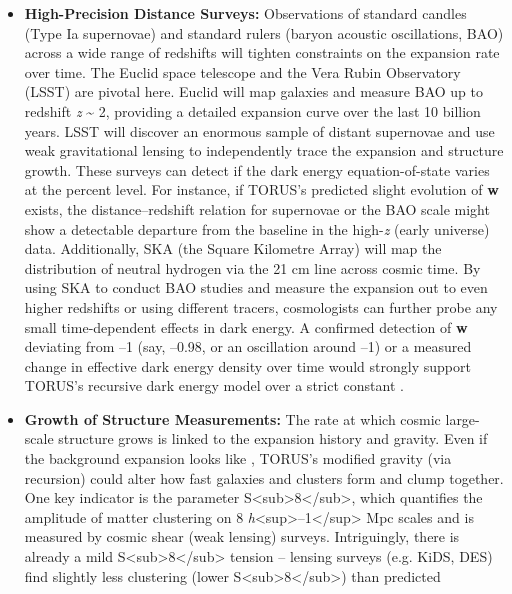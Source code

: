 \documentclass[
]{article}
\begin{document}
\begin{itemize}
\item
  \textbf{High-Precision Distance Surveys:} Observations of standard
  candles (Type Ia supernovae) and standard rulers (baryon acoustic
  oscillations, BAO) across a wide range of redshifts will tighten
  constraints on the expansion rate over time. The Euclid space
  telescope and the Vera Rubin Observatory (LSST) are pivotal here.
  Euclid will map galaxies and measure BAO up to redshift \emph{z}
  \textasciitilde{} 2, providing a detailed expansion curve over the
  last 10 billion years. LSST will discover an enormous sample of
  distant supernovae and use weak gravitational lensing to independently
  trace the expansion and structure growth. These surveys can detect if
  the dark energy equation-of-state varies at the percent level. For
  instance, if TORUS's predicted slight evolution of \textbf{w} exists,
  the distance--redshift relation for supernovae or the BAO scale might
  show a detectable departure from the \LambdaCDM baseline in the
  high-\emph{z} (early universe) data. Additionally, SKA (the Square
  Kilometre Array) will map the distribution of neutral hydrogen via the
  21 cm line across cosmic time. By using SKA to conduct BAO studies and
  measure the expansion out to even higher redshifts or using different
  tracers, cosmologists can further probe any small time-dependent
  effects in dark energy. A confirmed detection of \textbf{w} deviating
  from --1 (say, --0.98, or an oscillation around --1) or a measured
  change in effective dark energy density over time would strongly
  support TORUS's recursive dark energy model over a strict constant \Lambda.
\item
  \textbf{Growth of Structure Measurements:} The rate at which cosmic
  large-scale structure grows is linked to the expansion history and
  gravity. Even if the background expansion looks like \LambdaCDM, TORUS's
  modified gravity (via recursion) could alter how fast galaxies and
  clusters form and clump together. One key indicator is the parameter
  S\textless sub\textgreater8\textless/sub\textgreater, which quantifies
  the amplitude of matter clustering on 8
  \emph{h}\textless sup\textgreater--1\textless/sup\textgreater{} Mpc
  scales and is measured by cosmic shear (weak lensing) surveys.
  Intriguingly, there is already a mild
  S\textless sub\textgreater8\textless/sub\textgreater{} tension --
  lensing surveys (e.g. KiDS, DES) find slightly less clustering (lower
  S\textless sub\textgreater8\textless/sub\textgreater) than predicted

\end{itemize}
\end{document}
